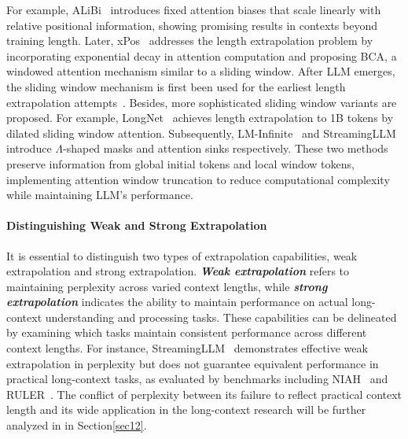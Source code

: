 For example, ALiBi~\citep{presstrain,yang2023baichuan} introduces fixed attention biases that scale linearly with relative positional information, showing promising results in contexts beyond training length. Later, xPos~\citep{sun2022length,sun2023retentive} addresses the length extrapolation problem by incorporating exponential decay in attention computation and proposing BCA, a windowed attention mechanism similar to a sliding window. After LLM emerges, the sliding window mechanism is first been used for the earliest length extrapolation attempts~\citep{bai2023qwen,jiang2023mistral}. Besides, more sophisticated sliding window variants are proposed. For example, LongNet~\citep{ding2023longnet} achieves length extrapolation to 1B tokens by dilated sliding window attention. Subsequently, LM-Infinite~\citep{han2024lm} and StreamingLLM~\citep{xiaoefficient} introduce $\Lambda$-shaped masks and attention sinks respectively. These two methods preserve information from global initial tokens and local window tokens, implementing attention window truncation to reduce computational complexity while maintaining LLM's performance.

\paragraph{Distinguishing Weak and Strong Extrapolation}
It is essential to distinguish two types of extrapolation capabilities, weak extrapolation and strong extrapolation. \textit{\textbf{Weak extrapolation}} refers to maintaining perplexity across varied context lengths, while \textit{\textbf{strong extrapolation}} indicates the ability to maintain performance on actual long-context understanding and processing tasks. These capabilities can be delineated by examining which tasks maintain consistent performance across different context lengths. For instance, StreamingLLM~\citep{xiaoefficient} demonstrates effective weak extrapolation in perplexity but does not guarantee equivalent performance in practical long-context tasks, as evaluated by benchmarks including NIAH~\citep{niah} and RULER~\citep{hsieh2024ruler}. The conflict of perplexity between its failure to reflect practical context length and its wide application in the long-context research will be further analyzed in \textbf{} in Section\ref{sec12}.

